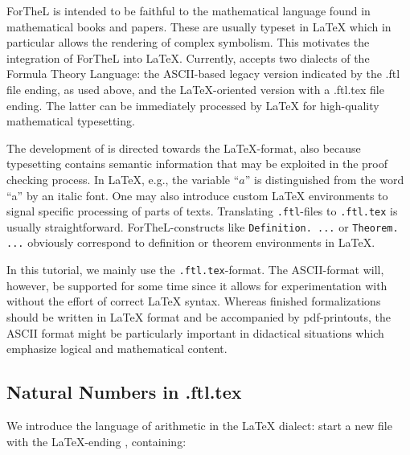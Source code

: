 \documentclass[11pt]{article}
\begin{document}
ForTheL is intended to be faithful to the mathematical
language found in mathematical books and papers.
These are usually typeset in \LaTeX{} which in particular
allows the rendering of complex symbolism. This motivates the
integration of ForTheL into \LaTeX. Currently, \Naproche{}
accepts two dialects of the Formula Theory Language:
the ASCII-based legacy version indicated by the .ftl file ending, 
as used above,
and the LaTeX-oriented version with a .ftl.tex file ending.
The latter can be immediately processed by \LaTeX{} for
high-quality mathematical typesetting.

The development of \Naproche{} is directed towards the \LaTeX-format,
also because typesetting contains semantic information
that may be exploited in the proof checking process.
In \LaTeX{}, e.g., the variable ``$a$'' is distinguished from the word ``a''
by an italic font. One may also introduce custom \LaTeX{} environments
to signal specific processing of parts of texts.
Translating \verb+.ftl+-files to \verb+.ftl.tex+ is usually
straightforward. ForTheL-constructs like \verb+Definition. ...+
or \verb+Theorem. ...+ obviously correspond to definition or
theorem environments in \LaTeX.

In this tutorial, we mainly use the \verb+.ftl.tex+-format.
The ASCII-format will, however, be supported for some time
since it allows for experimentation with \Naproche{} without the
effort of correct \LaTeX{} syntax. Whereas finished \Naproche{}
formalizations should be written in \LaTeX{} format and be accompanied
by pdf-printouts, the ASCII format might be particularly important
in didactical situations which emphasize logical and mathematical content.

\subsection{Natural Numbers in .ftl.tex}

We introduce the language of arithmetic in the \LaTeX{} dialect:
start a new file with the \LaTeX-ending , containing:
\end{document}
